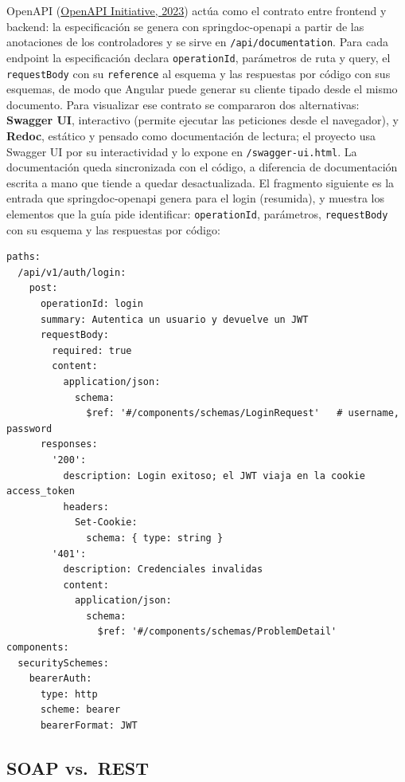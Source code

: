 \documentclass[12pt,a4paper]{article}
\begin{document}
OpenAPI (\hyperlink{ref:openapi}{OpenAPI Initiative, 2023}) actúa como el contrato entre frontend y backend: la
especificación se genera con springdoc-openapi a partir de las anotaciones de los
controladores y se sirve en \texttt{/api/documentation}. Para cada endpoint la
especificación declara \texttt{operationId}, parámetros de ruta y query, el
\texttt{requestBody} con su \texttt{reference} al esquema y las respuestas por código con
sus esquemas, de modo que Angular puede generar su cliente tipado desde el mismo
documento. Para visualizar ese contrato se compararon dos alternativas: \textbf{Swagger
UI}, interactivo (permite ejecutar las peticiones desde el navegador), y \textbf{Redoc},
estático y pensado como documentación de lectura; el proyecto usa Swagger UI por su
interactividad y lo expone en \texttt{/swagger-ui.html}. La documentación queda
sincronizada con el código, a diferencia de documentación escrita a mano que tiende a
quedar desactualizada. El fragmento siguiente es la entrada que springdoc-openapi genera
para el login (resumida), y muestra los elementos que la guía pide identificar:
\texttt{operationId}, parámetros, \texttt{requestBody} con su esquema y las respuestas
por código:

\begin{lstlisting}[caption={Documentación OpenAPI del endpoint de login (generada por springdoc-openapi, resumida).}]
paths:
  /api/v1/auth/login:
    post:
      operationId: login
      summary: Autentica un usuario y devuelve un JWT
      requestBody:
        required: true
        content:
          application/json:
            schema:
              $ref: '#/components/schemas/LoginRequest'   # username, password
      responses:
        '200':
          description: Login exitoso; el JWT viaja en la cookie access_token
          headers:
            Set-Cookie:
              schema: { type: string }
        '401':
          description: Credenciales invalidas
          content:
            application/json:
              schema:
                $ref: '#/components/schemas/ProblemDetail'
components:
  securitySchemes:
    bearerAuth:
      type: http
      scheme: bearer
      bearerFormat: JWT
\end{lstlisting}

\subsection{SOAP vs.\ REST}
\end{document}
